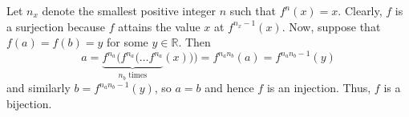 Let $n_x$ denote the smallest positive integer $n$ such that $f^n\left(x\right)=x$. Clearly, $f$ is a surjection because $f$ attains the value $x$ at $f^{n_x-1}\left(x\right)$. Now, suppose that $f\left(a\right)=f\left(b\right)=y$ for some $y\in\mathbb{R}$. Then \[a=\underbrace{f^{n_a}(f^{n_a}(\ldots f^{n_a}}_{n_b\text{ times}}(x)))=f^{n_an_b}\left(a\right)=f^{n_an_b-1}\left(y\right)\] and similarly $b=f^{n_an_b-1}\left(y\right)$, so $a=b$ and hence $f$ is an injection. Thus, $f$ is a bijection.